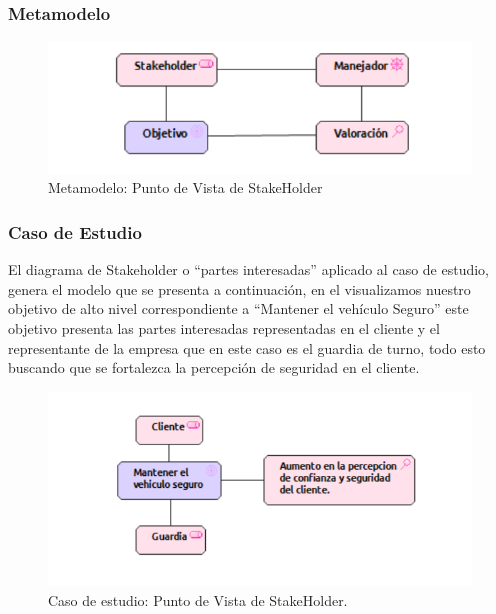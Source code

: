\subsubsection{Metamodelo}
\begin{figure}[H]
	\centering
	\includegraphics[width=1.0\textwidth]{imagenes/Metamodelos/Motivacion/meta_Stakeholder.pdf}
	\caption{Metamodelo: Punto de Vista de StakeHolder}
	\label{fig:gap_analysis}
\end{figure}

\subsubsection{Caso de Estudio}
El diagrama de Stakeholder o “partes interesadas” aplicado al caso de estudio, genera el modelo que se presenta a continuación, en el visualizamos nuestro objetivo de alto nivel correspondiente a “Mantener el vehículo Seguro” este objetivo presenta las partes interesadas representadas en el cliente y el representante de la empresa que en este caso es el guardia de turno, todo esto buscando que se fortalezca la percepción de seguridad en el cliente.

\begin{figure}[H]
	\centering
	\includegraphics[width=1.0\textwidth]{imagenes/Caso_Estudio/Motivacion/Stakeholder.PDF}
	\caption{Caso de estudio: Punto de Vista de StakeHolder.}
	\label{fig:gap_analysis}
\end{figure}



